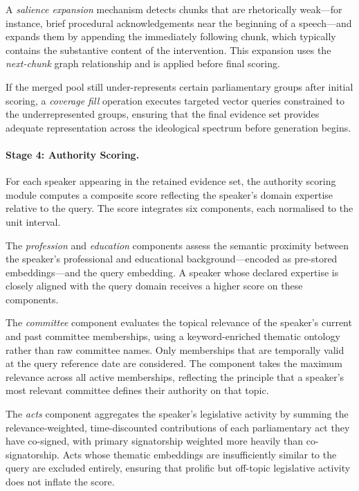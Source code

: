 A \textit{salience expansion} mechanism detects chunks that are rhetorically weak---for
instance, brief procedural acknowledgements near the beginning of a speech---and expands
them by appending the immediately following chunk, which typically contains the substantive
content of the intervention. This expansion uses the \textit{next-chunk} graph
relationship and is applied before final scoring.

If the merged pool still under-represents certain parliamentary groups after initial
scoring, a \textit{coverage fill} operation executes targeted vector queries constrained
to the underrepresented groups, ensuring that the final evidence set provides adequate
representation across the ideological spectrum before generation begins.

\paragraph{Stage 4: Authority Scoring.}
For each speaker appearing in the retained evidence set, the authority scoring module
computes a composite score reflecting the speaker's domain expertise relative to the
query. The score integrates six components, each normalised to the unit interval.

The \textit{profession} and \textit{education} components assess the semantic proximity
between the speaker's professional and educational background---encoded as pre-stored
embeddings---and the query embedding. A speaker whose declared expertise is closely
aligned with the query domain receives a higher score on these components.

The \textit{committee} component evaluates the topical relevance of the speaker's current
and past committee memberships, using a keyword-enriched thematic ontology rather than
raw committee names. Only memberships that are temporally valid at the query reference
date are considered. The component takes the maximum relevance across all active
memberships, reflecting the principle that a speaker's most relevant committee defines
their authority on that topic.

The \textit{acts} component aggregates the speaker's legislative activity by summing the
relevance-weighted, time-discounted contributions of each parliamentary act they have
co-signed, with primary signatorship weighted more heavily than co-signatorship. Acts
whose thematic embeddings are insufficiently similar to the query are excluded entirely,
ensuring that prolific but off-topic legislative activity does not inflate the score.

